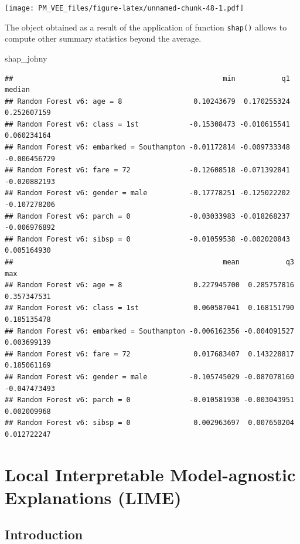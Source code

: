 \documentclass[12pt,]{krantz}
\newenvironment{Shaded}{\begin{snugshade}}{\end{snugshade}}
\newcommand{\NormalTok}[1]{#1}
\begin{document}
\texttt{[image: PM\_VEE\_files/figure-latex/unnamed-chunk-48-1.pdf]}

The object obtained as a result of the application of function \texttt{shap()} allows to compute other summary statistics beyond the average.

\begin{Shaded}
\begin{Highlighting}[]
\NormalTok{shap_johny}
\end{Highlighting}
\end{Shaded}

\begin{verbatim}
##                                                  min           q1       median
## Random Forest v6: age = 8                 0.10243679  0.170255324  0.252607159
## Random Forest v6: class = 1st            -0.15308473 -0.010615541  0.060234164
## Random Forest v6: embarked = Southampton -0.01172814 -0.009733348 -0.006456729
## Random Forest v6: fare = 72              -0.12608518 -0.071392841 -0.020882193
## Random Forest v6: gender = male          -0.17778251 -0.125022202 -0.107278206
## Random Forest v6: parch = 0              -0.03033983 -0.018268237 -0.006976892
## Random Forest v6: sibsp = 0              -0.01059538 -0.002020843  0.005164930
##                                                  mean           q3          max
## Random Forest v6: age = 8                 0.227945700  0.285757816  0.357347531
## Random Forest v6: class = 1st             0.060587041  0.168151790  0.185135478
## Random Forest v6: embarked = Southampton -0.006162356 -0.004091527  0.003699139
## Random Forest v6: fare = 72               0.017683407  0.143228817  0.185061169
## Random Forest v6: gender = male          -0.105745029 -0.087078160 -0.047473493
## Random Forest v6: parch = 0              -0.010581930 -0.003043951  0.002009968
## Random Forest v6: sibsp = 0               0.002963697  0.007650204  0.012722247
\end{verbatim}

\hypertarget{LIME}{%
\section{Local Interpretable Model-agnostic Explanations (LIME)}\label{LIME}}

\hypertarget{LIMEIntroduction}{%
\subsection{Introduction}\label{LIMEIntroduction}}
\end{document}
